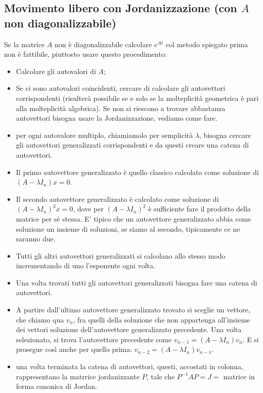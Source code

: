     \subsection{Movimento libero con Jordanizzazione (con $A$ non diagonalizzabile)}
    Se la matrice $A$ non è diagonalizzabile calcolare $e^{At}$ col metodo spiegato prima non è fattibile, piuttosto usare questo procedimento:
    \begin{itemize}
        \item Calcolare gli autovalori di $A$;
        \item Se ci sono autovalori coincidenti, cercare di calcolare gli autovettori corrispondenti (risulterà possibile se e solo se la molteplicità geometrica è pari alla molteplicità algebrica). Se non si riescono a trovare abbastanza autovettori bisogna usare la Jordanizzazione, vediamo come fare.
        \item per ogni autovalore multiplo, chiamiamolo per semplicità $\lambda$, bisogna cercare gli autovettori generalizzati corrispondenti e da questi creare una catena di autovettori.
        \item Il primo autovettore generalizzato è quello classico calcolato come soluzione di $(A-\lambda I_n) x = 0$.
        \item Il secondo autovettore generalizzato è calcolato come soluzione di $(A-\lambda I_n)^2 x = 0$, dove per $(A-\lambda I_n)^2$ è sufficiente fare il prodotto della matrice per sè stessa. E' tipico che un autovettore generalizzato abbia come soluzione un insieme di soluzioni, se siamo al secondo, tipicamente ce ne saranno due.
        \item Tutti gli altri autovettori generalizzati si calcolano allo stesso modo incrementando di uno l'esponente ogni volta.
        \item Una volta trovati tutti gli autovettori generalizzati bisogna fare una catena di autovettori.
        \item A partire dall'ultimo autovettore generalizzato trovato si sceglie un vettore, che chiamo qua $v_n$, fra quelli della soluzione che non appartenga all'insieme dei vettori soluzione dell'autovettore generalizzato precedente. Una volta selezionato, si trova l'autovettore precedente come $v_{n-1} = (A- \lambda I_n)v_n$. E si prosegue così anche per quello prima: $v_{n-2} = (A-\lambda I_n) v_{n-1}$.
        \item una volta terminata la catena di autovettori, questi, accostati in colonna, rappresentano la matrrice jordanizzante $P$, tale che $P^{-1} A P = J =$ matrice in forma canonica di Jordan.
    \end{itemize}
